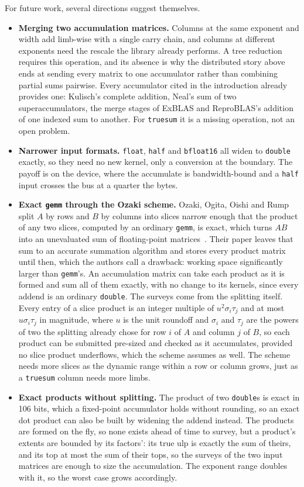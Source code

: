 \documentclass[acmsmall,screen,review]{acmart}
\newcommand{\code}[1]{\texttt{#1}}
\newcommand{\truesum}{\code{truesum}}
\begin{document}
For future work, several directions suggest themselves.
\begin{itemize}
\item \textbf{Merging two accumulation matrices.} Columns at the same exponent and width add limb-wise with a single carry chain, and columns at different exponents need the rescale the library already performs. A tree reduction requires this operation, and its absence is why the distributed story above ends at sending every matrix to one accumulator rather than combining partial sums pairwise. Every accumulator cited in the introduction already provides one: Kulisch's complete addition, Neal's sum of two superaccumulators, the merge stages of ExBLAS and ReproBLAS's addition of one indexed sum to another. For \truesum{} it is a missing operation, not an open problem.
\item \textbf{Narrower input formats.} \code{float}, \code{half} and \code{bfloat16} all widen to \code{double} exactly, so they need no new kernel, only a conversion at the boundary. The payoff is on the device, where the accumulate is bandwidth-bound and a \code{half} input crosses the bus at a quarter the bytes.
\item \textbf{Exact \code{gemm} through the Ozaki scheme.} Ozaki, Ogita, Oishi and Rump split $A$ by rows and $B$ by columns into slices narrow enough that the product of any two slices, computed by an ordinary \code{gemm}, is exact, which turns $AB$ into an unevaluated sum of floating-point matrices~\cite{ozaki2012}. Their paper leaves that sum to an accurate summation algorithm and stores every product matrix until then, which the authors call a drawback: working space significantly larger than \code{gemm}'s. An accumulation matrix can take each product as it is formed and sum all of them exactly, with no change to its kernels, since every addend is an ordinary \code{double}. The surveys come from the splitting itself. Every entry of a slice product is an integer multiple of $u^2 \sigma_i \tau_j$ and at most $u \sigma_i \tau_j$ in magnitude, where $u$ is the unit roundoff and $\sigma_i$ and $\tau_j$ are the powers of two the splitting already chose for row $i$ of $A$ and column $j$ of $B$, so each product can be submitted pre-sized and checked as it accumulates, provided no slice product underflows, which the scheme assumes as well. The scheme needs more slices as the dynamic range within a row or column grows, just as a \truesum{} column needs more limbs.
\item \textbf{Exact products without splitting.} The product of two \code{double}s is exact in 106 bits, which a fixed-point accumulator holds without rounding, so an exact dot product can also be built by widening the addend instead. The products are formed on the fly, so none exists ahead of time to survey, but a product's extents are bounded by its factors': its true ulp is exactly the sum of theirs, and its top at most the sum of their tops, so the surveys of the two input matrices are enough to size the accumulation. The exponent range doubles with it, so the worst case grows accordingly.

\end{itemize}
\end{document}
